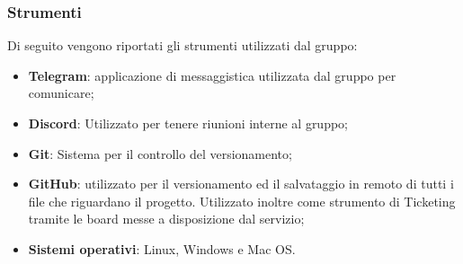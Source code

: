 		\subsubsection{Strumenti}
		Di seguito vengono riportati gli strumenti utilizzati dal gruppo:
		\begin{itemize}
			\item \textbf{Telegram}: applicazione di messaggistica utilizzata dal gruppo per comunicare;
			\item \textbf{Discord}: Utilizzato per tenere riunioni interne al gruppo;
			\item \textbf{Git}: Sistema per il controllo del versionamento;
			\item \textbf{GitHub}: utilizzato per il versionamento ed il salvataggio in remoto di tutti i file che riguardano il progetto. Utilizzato inoltre come strumento di Ticketing tramite le board messe a disposizione dal servizio;
			\item \textbf{Sistemi operativi}: Linux, Windows e Mac OS.
		\end{itemize}
			
		
